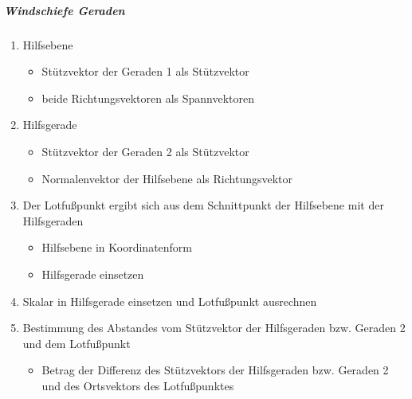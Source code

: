 \documentclass{article}
\begin{document}
  \subparagraph{Windschiefe Geraden}
  \begin{enumerate}
  	\item Hilfsebene
  	\begin{itemize}
  		\item Stützvektor der Geraden 1 als Stützvektor
  		\item beide Richtungsvektoren als Spannvektoren
  	\end{itemize}
  	\item Hilfsgerade
  	\begin{itemize}
  		\item Stützvektor der Geraden 2 als Stützvektor
  		\item Normalenvektor der Hilfsebene als Richtungsvektor
  	\end{itemize}
  	\item Der Lotfußpunkt ergibt sich aus dem Schnittpunkt der Hilfsebene mit der Hilfsgeraden
  	\begin{itemize}
  		\item Hilfsebene in Koordinatenform
  		\item Hilfsgerade einsetzen
  	\end{itemize}
  	\item Skalar in Hilfsgerade einsetzen und Lotfußpunkt ausrechnen
  	\item Bestimmung des Abstandes vom Stützvektor der Hilfsgeraden bzw. Geraden 2 und dem Lotfußpunkt
  	\begin{itemize}
  		\item Betrag der Differenz des Stützvektors der Hilfsgeraden bzw. Geraden 2 und des Ortsvektors des Lotfußpunktes 
  	\end{itemize}
  \end{enumerate}
  
\end{document}
